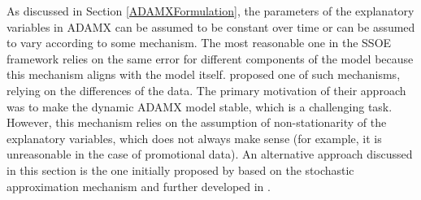 \documentclass[
]{book}
\theoremstyle{definition}
\theoremstyle{definition}
\theoremstyle{definition}
\theoremstyle{definition}
\theoremstyle{remark}
\begin{document}
As discussed in Section \ref{ADAMXFormulation}, the parameters of the explanatory variables in ADAMX can be assumed to be constant over time or can be assumed to vary according to some mechanism. The most reasonable one in the SSOE framework relies on the same error for different components of the model because this mechanism aligns with the model itself. \citet{Osman2015} proposed one of such mechanisms, relying on the differences of the data. The primary motivation of their approach was to make the dynamic ADAMX model stable, which is a challenging task. However, this mechanism relies on the assumption of non-stationarity of the explanatory variables, which does not always make sense (for example, it is unreasonable in the case of promotional data). An alternative approach discussed in this section is the one initially proposed by \citet{Svetunkov1985} based on the stochastic approximation mechanism and further developed in \citet{Svetunkov2014Textbook}.
\end{document}
